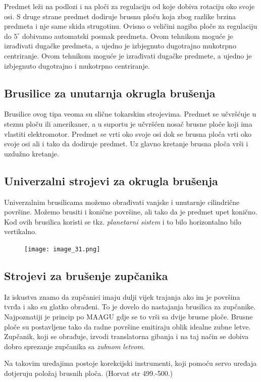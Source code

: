 \documentclass[a4paper,12pt]{article}
\numberwithin{figure}{section}
\begin{document}
\FloatBarrier
Predmet leži na podlozi i na ploči za regulaciju od koje dobiva rotaciju oko svoje osi. S druge strane predmet dodiruje brusnu ploču koja zbog razlike brzina predmeta i nje same skida strugotinu. Ovisno o veličini nagiba ploče za regulaciju do $5^{\circ}$ dobivamo automatski posmak predmeta. Ovom tehnikom moguće je izrađivati dugačke predmeta, a ujedno je izbjegnuto dugotrajno mukotrpno centriranje. Ovom tehnikom moguće je izrađivati dugačke predmete, a ujedno je izbjegnuto dugotrajno i mukotrpno centriranje. 
\subsection{Brusilice za unutarnja okrugla brušenja}
Brusilice ovog tipa veoma su slične tokarskim strojevima. Predmet se učvršćuje u steznu ploču ili amerikaner, a u suportu je učvršćen nosač brusne ploče koji ima vlastiti elektromotor. Predmet se vrti oko svoje osi dok se brusna ploča vrti oko svoje osi ali i tako da dodiruje predmet. Uz glavno kretanje brusna ploča vrši i uzdužno kretanje.
\subsection{Univerzalni strojevi za okrugla brušenja}
Univerzalnim brusilicama možemo obrađivati vanjske i unutarnje cilindrične površine. Možemo brusiti i konične površine, ali tako da je predmet upet konično. Kod ovih brusilica koristi se tkz. \textit{planetarni sistem} i to bilo horizontalno bilo vertikalno.
\begin{figure}[!h]
\centering
\texttt{[image: image\_31.png]}
\end{figure}
\FloatBarrier
\subsection{Strojevi za brušenje zupčanika}
Iz iskustva znamo da zupčanici imaju dulji vijek trajanja ako im je površina tvrđa i ako su glatko obrađeni. To je dovelo do nastajanja brusilica za zupčanike. Najpoznatiji je princip po MAAGU gdje se to vrši sa dvije brusne ploče. Brusne ploče su postavljene tako da radne površine emitiraju oblik idealne zubne letve. Zupčanik, koji se obrađuje, izvodi translatorna gibanja i na taj način se dobiva dobro sprezanje zupčanika sa \textit{zubnom letvom}. \par 
Na takovim uređajima postoje korekcijski instrumenti, koji pomoću servo uređaja dotjeruju položaj brusnih ploča. (Horvat str 499.-500.)
\end{document}
